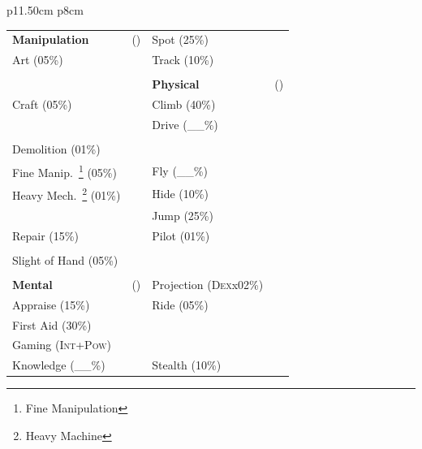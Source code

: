 \documentclass[11pt,twoside,a4paper]{article}
\begin{document}
\begin{tabular}{ p{11.50cm} p{8cm} }
{\begin{minipage}[ht]{12.00cm}
{\begin{minipage}{0.9\textwidth}
\begin{small}
\begin{tabular}[c]{ p{} p{} p{} p{} }
					\textbf{Manipulation}		& (\dotfill)				&	Spot (25\%)				& \dotfill \shadowbox{~}	\\
					Art (05\%)					& 							&	Track (10\%)			& \dotfill \shadowbox{~}	\\
					\dotfill	 				& \dotfill \shadowbox{~}	&							& 							\\
					\dotfill	 				& \dotfill \shadowbox{~}	&	\textbf{Physical}		& (\dotfill)				\\
					Craft (05\%)				& \dotfill \shadowbox{~}	&	Climb (40\%)			& \dotfill \shadowbox{~}	\\
					\dotfill	 				& \dotfill \shadowbox{~}	&	Drive (\_\_\%)			& 							\\
					\dotfill	 				& \dotfill \shadowbox{~}	&	\dotfill	 			& \dotfill \shadowbox{~}	\\
					Demolition (01\%)			& \dotfill \shadowbox{~}	&	\dotfill	 			& \dotfill \shadowbox{~}	\\
					Fine Manip.~\footnote{Fine Manipulation} (05\%)				& \dotfill \shadowbox{~}	&	Fly (\_\_\%)			& \dotfill \shadowbox{~}	\\
					Heavy Mech.~\footnote{Heavy Machine} (01\%)					& \dotfill \shadowbox{~}	&	Hide (10\%)				& \dotfill \shadowbox{~}	\\
					\dotfill	 				& \dotfill \shadowbox{~}	&	Jump (25\%)				& \dotfill \shadowbox{~}	\\
					Repair (15\%)				& \dotfill \shadowbox{~}	&	Pilot (01\%)			& \dotfill \shadowbox{~}	\\
					\dotfill	 				& \dotfill \shadowbox{~}	&	\dotfill	 			& \dotfill \shadowbox{~}	\\
					Slight of Hand (05\%)		& \dotfill \shadowbox{~}	&	\dotfill	 			& \dotfill \shadowbox{~}	\\
								 				& 							&	\dotfill	 			& \dotfill \shadowbox{~}	\\
					\textbf{Mental}				& (\dotfill)				&	{\footnotesize Projection (\textsc{Dex}x02\%)}		& \dotfill \shadowbox{~}	\\
					Appraise (15\%)				& \dotfill \shadowbox{~}	&	Ride (05\%)				& \dotfill \shadowbox{~}	\\
					First Aid (30\%)			& \dotfill \shadowbox{~}	&	\dotfill	 			& \dotfill \shadowbox{~}	\\
					Gaming (\textsc{Int+Pow})	& \dotfill \shadowbox{~}	&	\dotfill	 			& \dotfill \shadowbox{~}	\\	 	
					Knowledge (\_\_\%)			& 							&	Stealth (10\%)			& \dotfill \shadowbox{~}	\\

\end{tabular}
\end{small}
\end{minipage}}
\end{minipage}}
\end{tabular}
\end{document}
